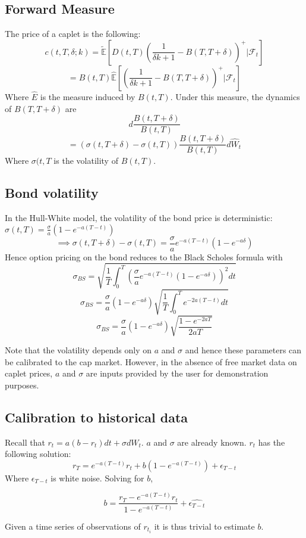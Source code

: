 \documentclass{article}
\theoremstyle{definition}
\begin{document}
\subsection{Forward Measure}
The price of a caplet is the following:
\[c(t, T, \delta; k)=\mathbb{\tilde{E}}\left[D(t, T)\left(\frac{1}{\delta k+1}-B(T, T+\delta)\right)^+ |\mathcal{F}_t\right]\]
\[=B(t, T)\mathbb{\hat{E}}\left[\left(\frac{1}{\delta k+1}-B(T, T+\delta)\right)^+ |\mathcal{F}_t\right]\]
Where \(\hat{E}\) is the measure induced by \(B(t, T)\).  Under this measure, the dynamics of \(B(T, T+\delta)\) are 
\[d\frac{B(t, T+\delta)}{B(t, T)}\]
\[=\left(\sigma(t, T+\delta)-\sigma(t, T)\right) \frac{B(t, T+\delta)}{B(t, T)}d\hat{W}_t\]
Where \(\sigma(t, T\) is the volatility of \(B(t, T)\).

\subsection{Bond volatility} \label{bondvolatility}
In the Hull-White model, the volatility of the bond price is deterministic: \(\sigma(t, T)=\frac{\sigma}{a}(1-e^{-a(T-t)})\)
\[\implies \sigma(t, T+\delta)-\sigma(t, T)=\frac{\sigma}{a}e^{-a(T-t)}\left(1-e^{-a\delta}\right)\]
Hence option pricing on the bond reduces to the Black Scholes formula with \[\sigma_{BS}=\sqrt{\frac{1}{T} \int_0 ^ T \left(\frac{\sigma}{a}e^{-a(T-t)}\left(1-e^{-a\delta}\right)\right)^2 dt}\]
\[\sigma_{BS}=\frac{\sigma}{a}\left(1-e^{-a\delta}\right)\sqrt{\frac{1}{T} \int_0 ^ T e^{-2a(T-t)} dt}\]
\[\sigma_{BS}=\frac{\sigma}{a}\left(1-e^{-a\delta}\right)\sqrt{\frac{1-e^{-2aT}}{2aT}}\]

Note that the volatility depends only on \(a\) and \(\sigma\) and hence these parameters can be calibrated to the cap market. However, in the absence of free market data on caplet prices, \(a\) and \(\sigma\) are inputs provided by the user for demonstration purposes.  

\subsection{Calibration to historical data}
 Recall that \(r_t=a(b-r_t)dt+\sigma dW_t\).  \(a\) and \(\sigma\) are already known.  \(r_t\) has the following solution:
\[r_T= e^{-a(T-t)}r_t+b\left(1-e^{-a(T-t)}\right)+\epsilon_{T-t}\]
Where \(\epsilon_{T-t}\) is white noise.  Solving for \(b\),

\[b=\frac{r_T-e^{-a(T-t)}r_t}{1-e^{-a(T-t)}}+\hat{\epsilon_{T-t}}\]

Given a time series of observations of \(r_{t_i}\) it is thus trivial to estimate \(b\).
\end{document}
